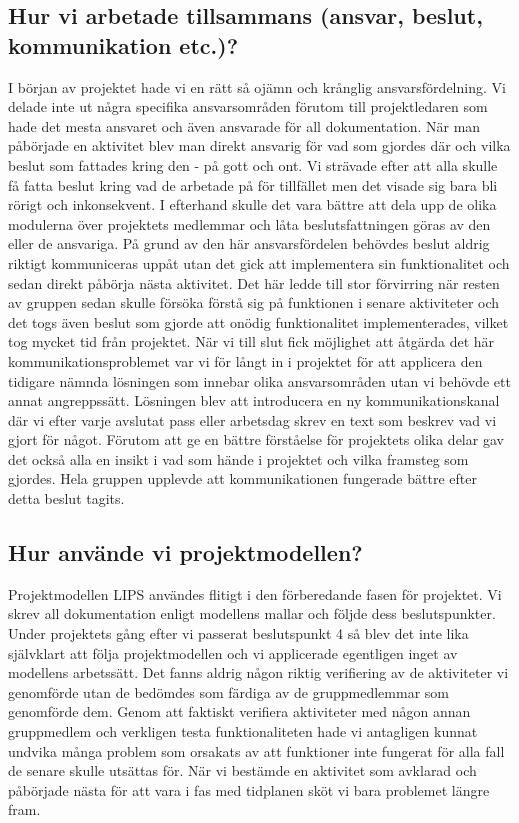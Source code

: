\documentclass{article}
\begin{document}
\subsection{Hur vi arbetade tillsammans (ansvar, beslut, kommunikation etc.)?}
I början av projektet hade vi en rätt så ojämn och krånglig ansvarsfördelning. Vi delade inte ut några specifika ansvarsområden förutom till projektledaren som hade det mesta ansvaret och även ansvarade för all dokumentation. När man påbörjade en aktivitet blev man direkt ansvarig för vad som gjordes där och vilka beslut som fattades kring den - på gott och ont. Vi strävade efter att alla skulle få fatta beslut kring vad de arbetade på för tillfället men det visade sig bara bli rörigt och inkonsekvent. I efterhand skulle det vara bättre att dela upp de olika modulerna över projektets medlemmar och låta beslutsfattningen göras av den eller de ansvariga.
\newline\newline
På grund av den här ansvarsfördelen behövdes beslut aldrig riktigt kommuniceras uppåt utan det gick att implementera sin funktionalitet och sedan direkt påbörja nästa aktivitet. Det här ledde till stor förvirring när resten av gruppen sedan skulle försöka förstå sig på funktionen i senare aktiviteter och det togs även beslut som gjorde att onödig funktionalitet implementerades, vilket tog mycket tid från projektet. När vi till slut fick möjlighet att åtgärda det här kommunikationsproblemet var vi för långt in i projektet för att applicera den tidigare nämnda lösningen som innebar olika ansvarsområden utan vi behövde ett annat angreppssätt. Lösningen blev att introducera en ny kommunikationskanal där vi efter varje avslutat pass eller arbetsdag skrev en text som beskrev vad vi gjort för något. Förutom att ge en bättre förståelse för projektets olika delar gav det också alla en insikt i vad som hände i projektet och vilka framsteg som gjordes. Hela gruppen upplevde att kommunikationen fungerade bättre efter detta beslut tagits.

\subsection{Hur använde vi projektmodellen?}
Projektmodellen LIPS användes flitigt i den förberedande fasen för projektet. Vi skrev all dokumentation enligt modellens mallar och följde dess beslutspunkter. Under projektets gång efter vi passerat beslutspunkt 4 så blev det inte lika självklart att följa projektmodellen och vi applicerade egentligen inget av modellens arbetssätt. Det fanns aldrig någon riktig verifiering av de aktiviteter vi genomförde utan de bedömdes som färdiga av de gruppmedlemmar som genomförde dem. Genom att faktiskt verifiera aktiviteter med någon annan gruppmedlem och verkligen testa funktionaliteten hade vi antagligen kunnat undvika många problem som orsakats av att funktioner inte fungerat för alla fall de senare skulle utsättas för. När vi bestämde en aktivitet som avklarad och påbörjade nästa för att vara i fas med tidplanen sköt vi bara problemet längre fram.
\end{document}
